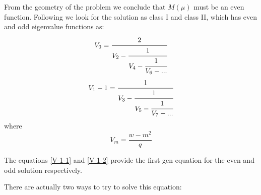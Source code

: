 From the geometry of the problem we conclude that $ M(\mu) $ must be an even function.  Following \cite{Mathieu4} we look for the solution as class I and class II, which has even and odd eigenvalue functions as:
\begin{equation}
\begin{split}
V_0 = \cfrac{2}{V_2 - \cfrac{1}{V_4 - \cfrac{1}{V_6 - ...}}}\label{V-1-1}
\end{split}
\end{equation}
\begin{equation}
\begin{split}
V_1 - 1 = \cfrac{1}{V_3 - \cfrac{1}{V_5 - \cfrac{1}{V_7 - ...}}}\label{V-1-2}
\end{split}
\end{equation}
where 
\begin{equation}
V_m = \frac{w - m^2}{q}
\end{equation}

The equations \ref{V-1-1} and \ref{V-1-2} provide the first gen equation for the even and odd solution respectively.

There are actually two ways to try to solve this equation:


